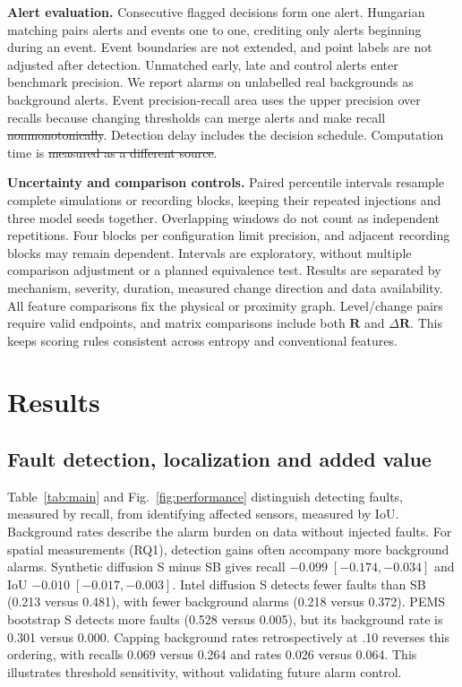 \documentclass{llncs}
\newcommand{\R}{\mathbf R}
\providecommand{\DIFaddtex}[1]{{\protect\color{blue}\uwave{#1}}} %
\providecommand{\DIFdeltex}[1]{{\protect\color{red}\sout{#1}}}                      %
\providecommand{\DIFaddbegin}{} %
\providecommand{\DIFaddend}{} %
\providecommand{\DIFdelbegin}{} %
\providecommand{\DIFdelend}{} %
\providecommand{\DIFadd}[1]{\texorpdfstring{\DIFaddtex{#1}}{#1}} %
\providecommand{\DIFdel}[1]{\texorpdfstring{\DIFdeltex{#1}}{}} %
\begin{document}
\textbf{Alert evaluation.} Consecutive flagged decisions form one alert.
Hungarian matching pairs alerts and events one to one, crediting only alerts
beginning during an event. Event boundaries are not extended, and point
labels are not adjusted after detection. Unmatched early, late and control
alerts enter benchmark precision. We report alarms on unlabelled real
backgrounds as background alerts. Event precision-recall area uses the upper
precision  over recalls because changing thresholds can
merge alerts and make recall \DIFdelbegin \DIFdel{nonmonotonically}\DIFdelend \DIFaddbegin \DIFadd{nonmonotonic}\DIFaddend . Detection delay includes the
decision schedule. Computation time is \DIFdelbegin \DIFdel{measured as a different source}\DIFdelend \DIFaddbegin \DIFadd{reported separately}\DIFaddend .

\textbf{Uncertainty and comparison controls.} Paired percentile intervals
resample complete simulations or recording blocks, keeping their repeated
injections and three model seeds together. Overlapping windows do not count
as independent repetitions. Four blocks per configuration limit precision,
and adjacent recording blocks may remain dependent. Intervals are exploratory,
without multiple comparison adjustment or a planned equivalence test.
Results are separated by mechanism, severity, duration, measured change
direction and data availability. All feature comparisons fix the physical
or proximity graph. Level/change pairs require valid endpoints, and matrix
comparisons include both $\R$ and $\Delta\R$. This keeps scoring rules
consistent across entropy and conventional features.




\section{Results}

\subsection{Fault detection, localization and added value}
Table~\ref{tab:main} and Fig.~\ref{fig:performance} distinguish detecting
faults, measured by recall, from identifying affected sensors, measured by IoU.
Background rates describe the alarm burden on data without injected faults.
For spatial measurements (RQ1), detection gains often accompany more
background alarms. Synthetic diffusion S minus SB gives recall
$-0.099\;[-0.174,-0.034]$ and IoU $-0.010\;[-0.017,-0.003]$.
Intel diffusion S detects fewer faults than SB (0.213 versus 0.481),
with fewer background alarms (0.218 versus 0.372).
PEMS bootstrap S detects more faults (0.528 versus 0.005), but its
background rate is 0.301 versus 0.000. Capping background rates
retrospectively at .10 reverses this ordering, with recalls 0.069 versus
0.264 and rates 0.026 versus 0.064. This illustrates threshold sensitivity,
without validating future alarm control.
\end{document}
